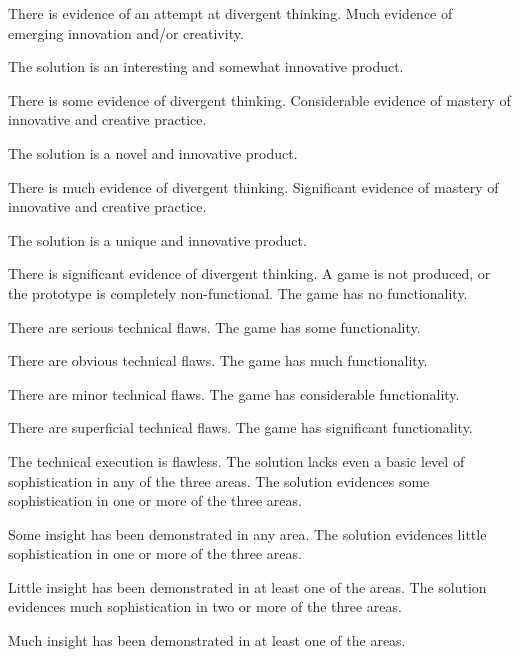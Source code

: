 \documentclass{../../fal_assignment}
\begin{document}
\begin{markingrubric}
		\par There is evidence of an attempt at divergent thinking.
		\grade Much evidence of emerging innovation and/or creativity.
		\par The solution is an interesting and somewhat innovative product.
		\par There is some evidence of divergent thinking.
		\grade Considerable evidence of mastery of innovative and creative practice.
		\par The solution is a novel and innovative product.
		\par There is much evidence of divergent thinking.
		\grade Significant evidence of mastery of innovative and creative practice.
		\par The solution is a unique and innovative product.
		\par There is significant evidence of divergent thinking.
		\grade\fail A game is not produced, or the prototype is completely non-functional.
		\grade The game has no functionality.
		\par There are serious technical flaws.
		\grade The game has some functionality.
		\par There are obvious technical flaws.
		\grade The game has much functionality.
		\par There are minor technical flaws.
		\grade The game has considerable functionality.
		\par There are superficial technical flaws.
		\grade The game has significant functionality.
		\par The technical execution is flawless.
		\grade\fail The solution lacks even a basic level of sophistication in any of the three areas.
		\grade The solution evidences some sophistication in one or more of the three areas.
		\par Some insight has been demonstrated in any area.
		\grade The solution evidences little sophistication in one or more of the three areas.
		\par Little insight has been demonstrated in at least one of the areas.
		\grade The solution evidences much sophistication in two or more of the three areas.
		\par Much insight has been demonstrated in at least one of the areas.

\end{markingrubric}
\end{document}
